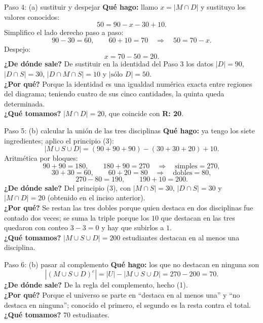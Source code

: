 \documentclass[11pt]{article}
\begin{document}
\begin{sol}
\begin{paso}{Paso 4: (a) sustituir y despejar}
\textbf{Qu\'e hago:} llamo $x = |M\cap D|$ y sustituyo los valores conocidos:
\[
50 = 90 - x - 30 + 10 .
\]
Simplifico el lado derecho paso a paso:
\[
90 - 30 = 60, \qquad 60 + 10 = 70 \quad\Longrightarrow\quad 50 = 70 - x .
\]
Despejo:
\[
x = 70 - 50 = 20 .
\]
\textbf{¿De d\'onde sale?} De sustituir en la identidad del Paso 3 los datos $|D|=90$, $|D\cap S|=30$, $|D\cap M\cap S|=10$ y $|\text{s\'olo }D|=50$.\\
\textbf{¿Por qu\'e?} Porque la identidad es una igualdad num\'erica exacta entre regiones del diagrama; teniendo cuatro de sus cinco cantidades, la quinta queda determinada.\\
\textbf{¿Qu\'e tomamos?} $|M\cap D| = 20$, que coincide con \textbf{R: 20}.
\end{paso}

\begin{paso}{Paso 5: (b) calcular la uni\'on de las tres disciplinas}
\textbf{Qu\'e hago:} ya tengo los siete ingredientes; aplico el principio (3):
\[
|M\cup S\cup D| = (90+90+90) - (30+30+20) + 10 .
\]
Aritm\'etica por bloques:
\[
90+90 = 180,\qquad 180+90 = 270 \quad\Longrightarrow\quad \text{simples} = 270,
\]
\[
30+30 = 60,\qquad 60+20 = 80 \quad\Longrightarrow\quad \text{dobles} = 80,
\]
\[
270 - 80 = 190, \qquad 190 + 10 = 200 .
\]
\textbf{¿De d\'onde sale?} Del principio (3), con $|M\cap S|=30$, $|D\cap S|=30$ y $|M\cap D|=20$ (obtenido en el inciso anterior).\\
\textbf{¿Por qu\'e?} Se restan las tres dobles porque quien destaca en dos disciplinas fue contado dos veces; se suma la triple porque los $10$ que destacan en las tres quedaron con conteo $3-3=0$ y hay que subirlos a $1$.\\
\textbf{¿Qu\'e tomamos?} $|M\cup S\cup D| = 200$ estudiantes destacan en al menos una disciplina.
\end{paso}

\begin{paso}{Paso 6: (b) pasar al complemento}
\textbf{Qu\'e hago:} los que no destacan en ninguna son
\[
|(M\cup S\cup D)^{c}| = |U| - |M\cup S\cup D| = 270 - 200 = 70 .
\]
\textbf{¿De d\'onde sale?} De la regla del complemento, hecho (1).\\
\textbf{¿Por qu\'e?} Porque el universo se parte en ``destaca en al menos una'' y ``no destaca en ninguna''; conocido el primero, el segundo es la resta contra el total.\\
\textbf{¿Qu\'e tomamos?} $70$ estudiantes.
\end{paso}

\end{sol}
\end{document}
